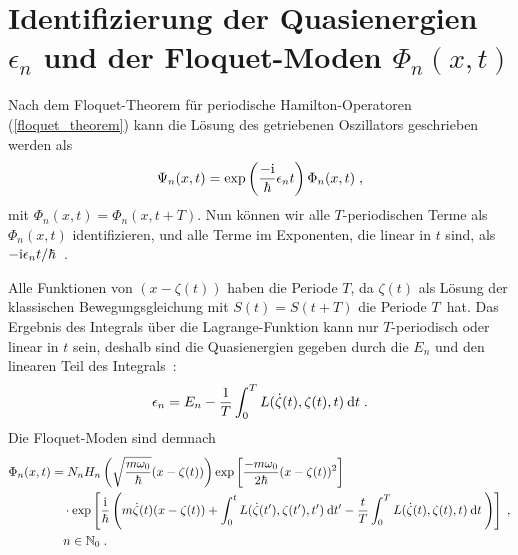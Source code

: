       \section{\texorpdfstring{Identifizierung der Quasienergien $\epsilon_n$ und der Floquet-Moden $\Phi_n(x,t)$}{Identifizierung der Quasienergien epsilon_n und der Floquet-Moden Phi_n(x,t)}}
        Nach dem Floquet-Theorem für periodische Hamilton-Operatoren (\ref{floquet_theorem}) kann die Lösung des getriebenen Oszillators geschrieben werden als
        \begin{equation}
          \Psi_n(x,t) = \exp\left(\frac{-\text i}{\hbar}\epsilon_nt\right)\Phi_n(x,t) \; ,
        \end{equation}
        mit $\Phi_n(x,t)=\Phi_n(x,t+T)$.
        Nun können wir alle $T$-periodischen Terme als $\Phi_n(x,t)$ identifizieren, und alle Terme im Exponenten, die linear in $t$ sind, als $-\text i\epsilon_n t/\hbar$~\cite{haengi}.

        Alle Funktionen von $(x-\zeta(t))$ haben die Periode $T$, da $\zeta(t)$ als Lösung der klassischen Bewegungsgleichung mit $S(t)=S(t+T)$ die Periode $T$ \,hat. Das
        Ergebnis des Integrals über die Lagrange-Funktion kann nur $T$-periodisch oder linear in $t$ sein, deshalb sind die Quasienergien gegeben durch die $E_n$ und den linearen Teil des Integrals~\cite{haengi}:
        \begin{equation}
          \epsilon_n = E_n - \frac{1}{T} \int_0^T L(\dot \zeta(t), \zeta(t), t) \: \text d t \; .
          \label{ep}
        \end{equation}
        Die Floquet-Moden sind demnach
        \begin{align}
            \Phi_n(x,t) &=
             N_nH_n\left(\sqrt{\frac{m\omega_0}{\hbar}}(x-\zeta(t))\right) \exp\left[\frac{-m\omega_0}{2\hbar}(x-\zeta(t))^2\right] \notag\\
            &\quad \cdot \exp\left[\frac{\text i}{\hbar}\left(m\dot \zeta(t)(x-\zeta(t))+\int_0^tL(\dot \zeta(t'),\zeta(t'),t')\:\text d t'-\frac{t}{T} \int_0^T L(\dot \zeta(t),\zeta(t),t)\:\text dt\: \right)\right] \; ,\notag\\
            &\quad n \in \mathbb{N}_0 \; .
            \label{floquet_moden_einzelner}
        \end{align}


